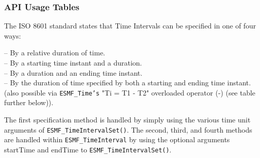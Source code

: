
\subsubsection [API Usage Tables] {API Usage Tables}
\newpage

The ISO 8601 standard states that Time Intervals can be specified in one of four ways:

  -- By a relative duration of time. \\
  -- By a starting time instant and a duration. \\
  -- By a duration and an ending time instant. \\
  -- By the duration of time specified by both a starting and ending time instant. (also possible via {\tt ESMF\_Time's} "Ti = T1 - T2" overloaded operator (-) (see table further below)).

The first specification method is handled by simply using the various time unit arguments of {\tt ESMF\_TimeIntervalSet()}.  The second, third, and fourth methods are handled within {\tt ESMF\_TimeInterval} by using the optional arguments startTime and endTime to {\tt ESMF\_TimeIntervalSet()}.

